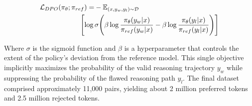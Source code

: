 \documentclass[conference]{IEEEtran}
\begin{document}
\begin{equation*}
	\begin{split}
		\mathcal{L}_{DPO}(\pi_{\theta}; \pi_{ref}) = & -\mathbb{E}_{(x, y_w, y_l) \sim \mathcal{D}} \\
		& \hspace*{-2em} \Biggl[ \log \sigma \Biggl( \beta \log \frac{\pi_{\theta}(y_w|x)}{\pi_{ref}(y_w|x)} - \beta \log \frac{\pi_{\theta}(y_l|x)}{\pi_{ref}(y_l|x)} \Biggr) \Biggr]
	\end{split}
\end{equation*}

Where $\sigma$ is the sigmoid function and $\beta$ is a hyperparameter that controls the extent of the policy's deviation from the reference model. This single objective implicitly maximizes the probability of the valid reasoning trajectory $y_w$ while suppressing the probability of the flawed reasoning path $y_l$. The final dataset comprised approximately 11,000 pairs, yielding about 2 million preferred tokens and 2.5 million rejected tokens.


\end{document}
